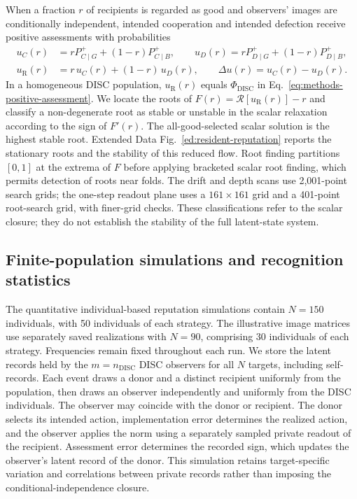 \documentclass[fleqn,10pt]{article}
\begin{document}
When a fraction $r$ of recipients is regarded as good and observers' images are conditionally independent, intended cooperation and intended defection receive positive assessments with probabilities
\begin{equation}
\begin{aligned}
u_C(r)&=rP^+_{C\mid G}+(1-r)P^+_{C\mid B},\qquad
u_D(r)=rP^+_{D\mid G}+(1-r)P^+_{D\mid B},\\
u_{\mathrm R}(r)&=r\,u_C(r)+(1-r)\,u_D(r),\qquad
\Delta u(r)=u_C(r)-u_D(r).
\end{aligned}
\label{eq:methods-resident-assessment}
\end{equation}
In a homogeneous DISC population, $u_{\mathrm R}(r)$ equals $\Phi_{\mathrm{DISC}}$ in Eq.~\eqref{eq:methods-positive-assessment}. We locate the roots of $F(r)=\mathcal R[u_{\mathrm R}(r)]-r$ and classify a non-degenerate root as stable or unstable in the scalar relaxation according to the sign of $F'(r)$. The all-good-selected scalar solution is the highest stable root. Extended Data Fig.~\ref{ed:resident-reputation} reports the stationary roots and the stability of this reduced flow. Root finding partitions $[0,1]$ at the extrema of $F$ before applying bracketed scalar root finding, which permits detection of roots near folds. The drift and depth scans use 2,001-point search grids; the one-step readout plane uses a $161\times161$ grid and a 401-point root-search grid, with finer-grid checks. These classifications refer to the scalar closure; they do not establish the stability of the full latent-state system.

\subsection*{Finite-population simulations and recognition statistics}

The quantitative individual-based reputation simulations contain $N=150$ individuals, with 50 individuals of each strategy. The illustrative image matrices use separately saved realizations with $N=90$, comprising 30 individuals of each strategy. Frequencies remain fixed throughout each run. We store the latent records held by the $m=n_{\mathrm{DISC}}$ DISC observers for all $N$ targets, including self-records. Each event draws a donor and a distinct recipient uniformly from the population, then draws an observer independently and uniformly from the DISC individuals. The observer may coincide with the donor or recipient. The donor selects its intended action, implementation error determines the realized action, and the observer applies the norm using a separately sampled private readout of the recipient. Assessment error determines the recorded sign, which updates the observer's latent record of the donor. This simulation retains target-specific variation and correlations between private records rather than imposing the conditional-independence closure.
\end{document}
